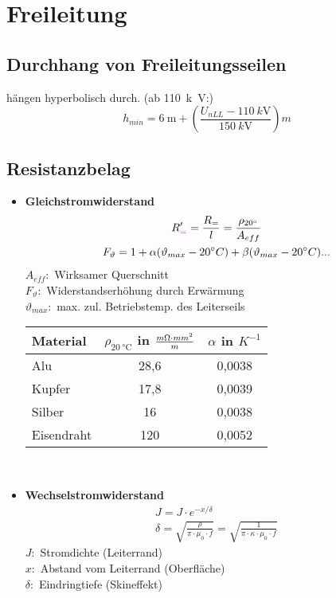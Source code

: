 \section{Freileitung}
\subsection{Durchhang von Freileitungsseilen}
hängen hyperbolisch durch. (ab \SI{110}{k\volt}:)
\begin{equation*}
    h_{min} = \SI{6}{\metre} + \left(\frac{U_{nLL} - \SI{110}{k\volt}}{\SI{150}{k\volt}}\right)m
\end{equation*}
\subsection{Resistanzbelag}
\begin{itemize}
\item[]{\textbf{Gleichstromwiderstand}}
\begin{gather*}
    R_{\textcolor{purple}{=}}' = \frac{R_{=}}{l} = \frac{\rho_{20 \degree}}{A_{eff}}\\
    F_{\vartheta} = 1 + \alpha (\vartheta_{max} - 20\degree C) + \beta (\vartheta_{max} - 20\degree C)...
\end{gather*}
$A_{eff}:$ Wirksamer Querschnitt\\
$F_{\vartheta}:$ Widerstandserhöhung durch Erwärmung\\
$\vartheta_{max}:$ max. zul. Betriebstemp. des Leiterseils\\

\begin{tabular}[h]{l|c|c}
    \hline
    Material & $\rho_{\SI{20}{\degreeCelsius}}$ in $\frac{m\ohm \cdot mm^2}{m}$ & $\alpha$ in $K^{-1}$ \\
    \hline
    Alu & 28,6 & 0,0038 \\
    \hline
    Kupfer & 17,8 & 0,0039 \\
    \hline
    Silber & 16 & 0,0038 \\
    \hline
    Eisendraht & 120 & 0,0052 \\
\end{tabular}\\

\item[]{\textbf{Wechselstromwiderstand}}
\begin{gather*}
    J = J \cdot e^{-x/\delta}\\
    \delta = \sqrt{ \frac{\rho}{\pi \cdot \mu_{0} \cdot f}}
     = \sqrt{ \frac{1}{\pi \cdot \kappa \cdot \mu_{0} \cdot f}}
\end{gather*}
$J:$ Stromdichte (Leiterrand)\\
$x:$ Abstand vom Leiterrand (Oberfläche)\\
$\delta:$ Eindringtiefe (Skineffekt)\\


\end{itemize}
